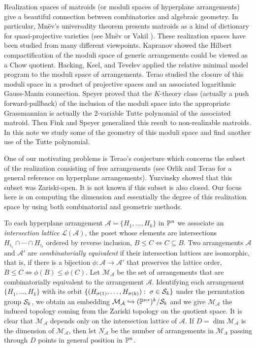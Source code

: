 \documentclass[12pt]{article}
\theoremstyle{plain}
\theoremstyle{definition}
\newcommand{\A}{\mathcal{A}}
\newcommand{\M}{\mathcal{M}}
\renewcommand{\L}{\mathcal{L}}
\renewcommand{\P}{\ensuremath \mathbb{P}}
\renewcommand{\S}{\ensuremath \mathcal{S}}
\begin{document}
Realization spaces of matroids (or moduli spaces of hyperplane arrangements) give a beautiful connection between combinatorics and algebraic geometry. In particular, Mn\"{e}v's universality theorem presents matroids as a kind of dictionary for quasi-projective varieties (see Mn\"{e}v \cite{Mnev} or Vakil \cite{VakilMurphy}). These realization spaces have been studied from many different viewpoints. Kapranov \cite{Kapranov-93} showed the Hilbert compactification of the moduli space of generic arrangements could be viewed as a Chow quotient.  Hacking, Keel, and Tevelev  \cite{HKT-06} applied the relative minimal model program to the moduli space of arrangements. Terao  \cite{Terao-02} studied the closure of this moduli space in a product of projective spaces and an associated logarithmic Gauss-Manin connection. Speyer \cite{Speyer-09} proved that the $K$-theory class (actually a push forward-pullback) of the inclusion of the moduli space into the appropriate Grassmannian is actually the 2-variable Tutte polynomial of the associated matroid. Then Fink and Speyer \cite{Fink-Speyer-12} generalized this result to non-realizable matroids. In this note we study some of the geometry of this moduli space and find another use of the Tutte polynomial.

One of our motivating problems is Terao's conjecture which concerns the subset of the realization consisting of  free arrangements (see Orlik and Terao \cite{OT} for a general reference on hyperplane arrangements). Yuzvinsky \cite{Yuz-93} showed that this subset was Zariski-open. It is not known if this subset is also closed. Our focus here is on computing the dimension and essentially the degree of this realization space by using both combinatorial and geometric methods. 

To each hyperplane arrangement $\A = \{H_1, \ldots, H_k\}$ in $\P^ n$
we associate an {\em intersection lattice} $\L(\A)$, the poset whose
elements are intersections $H_{i_1} \cap \cdots \cap H_{i_t}$ ordered
by reverse inclusion, $B \leq C \iff C \subseteq B$. Two arrangements
$\A$ and $\A'$ are {\em combinatorially equivalent} if their
intersection lattices are isomorphic, that is, if there is a bijection
$\phi: \A \rightarrow \A'$ that preserves the lattice order, $B \leq C
\iff \phi(B) \leq \phi(C)$. Let $\M_\A$ be the set of arrangements
that are combinatorially equivalent to the arrangement
$\A$. Identifying each arrangement $\{H_1, \ldots, H_k\}$ with its orbit
$\{(H_{\sigma(1)},\ldots, H_{\sigma(k)}):\;  \sigma \in \S_k\}$ under the permutation group
$\S_k$, we obtain an embedding $\M_\A \hookrightarrow
(\P^{n*})^k/\S_k$ and we give $\M_\A$ the induced topology coming from
the Zariski topology on the quotient space.  It is clear that $\M_\A$ depends only on the intersection lattice of $\A$. If $D = \dim
\M_\A$ is the dimension of $\M_\A$, then let $N_\A$ be the number of
arrangements in $\M_A$ passing through $D$ points in general
position in $\P^n$. 
\end{document}
